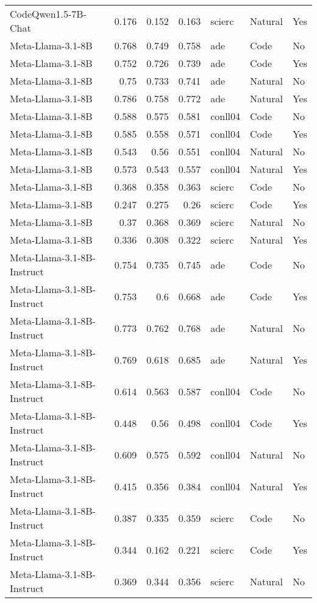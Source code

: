 \begin{tabular}{lrrrlll}
CodeQwen1.5-7B-Chat & 0.176 & 0.152 & 0.163 & scierc & Natural & Yes \\
Meta-Llama-3.1-8B & 0.768 & 0.749 & 0.758 & ade & Code & No \\
Meta-Llama-3.1-8B & 0.752 & 0.726 & 0.739 & ade & Code & Yes \\
Meta-Llama-3.1-8B & 0.75 & 0.733 & 0.741 & ade & Natural & No \\
Meta-Llama-3.1-8B & 0.786 & 0.758 & 0.772 & ade & Natural & Yes \\
Meta-Llama-3.1-8B & 0.588 & 0.575 & 0.581 & conll04 & Code & No \\
Meta-Llama-3.1-8B & 0.585 & 0.558 & 0.571 & conll04 & Code & Yes \\
Meta-Llama-3.1-8B & 0.543 & 0.56 & 0.551 & conll04 & Natural & No \\
Meta-Llama-3.1-8B & 0.573 & 0.543 & 0.557 & conll04 & Natural & Yes \\
Meta-Llama-3.1-8B & 0.368 & 0.358 & 0.363 & scierc & Code & No \\
Meta-Llama-3.1-8B & 0.247 & 0.275 & 0.26 & scierc & Code & Yes \\
Meta-Llama-3.1-8B & 0.37 & 0.368 & 0.369 & scierc & Natural & No \\
Meta-Llama-3.1-8B & 0.336 & 0.308 & 0.322 & scierc & Natural & Yes \\
Meta-Llama-3.1-8B-Instruct & 0.754 & 0.735 & 0.745 & ade & Code & No \\
Meta-Llama-3.1-8B-Instruct & 0.753 & 0.6 & 0.668 & ade & Code & Yes \\
Meta-Llama-3.1-8B-Instruct & 0.773 & 0.762 & 0.768 & ade & Natural & No \\
Meta-Llama-3.1-8B-Instruct & 0.769 & 0.618 & 0.685 & ade & Natural & Yes \\
Meta-Llama-3.1-8B-Instruct & 0.614 & 0.563 & 0.587 & conll04 & Code & No \\
Meta-Llama-3.1-8B-Instruct & 0.448 & 0.56 & 0.498 & conll04 & Code & Yes \\
Meta-Llama-3.1-8B-Instruct & 0.609 & 0.575 & 0.592 & conll04 & Natural & No \\
Meta-Llama-3.1-8B-Instruct & 0.415 & 0.356 & 0.384 & conll04 & Natural & Yes \\
Meta-Llama-3.1-8B-Instruct & 0.387 & 0.335 & 0.359 & scierc & Code & No \\
Meta-Llama-3.1-8B-Instruct & 0.344 & 0.162 & 0.221 & scierc & Code & Yes \\
Meta-Llama-3.1-8B-Instruct & 0.369 & 0.344 & 0.356 & scierc & Natural & No \\

\end{tabular}
